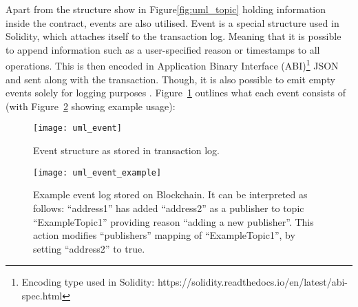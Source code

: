 Apart from the structure show in Figure\ref{fig:uml_topic} holding information inside the contract, events are also utilised. Event is a special structure used in Solidity, which attaches itself to the transaction log. Meaning that it is possible to append information such as a user-specified reason or timestamps to all operations. This is then encoded in Application Binary Interface (ABI)\footnote{Encoding type used in Solidity: https://solidity.readthedocs.io/en/latest/abi-spec.html} JSON and sent along with the transaction. Though, it is also possible to emit empty events solely for logging purposes \citep{dannen2017introducing}.  Figure~\ref{fig:uml_event} outlines what each event consists of (with Figure~\ref{fig:uml_event_example} showing example usage):

\begin{figure}[h]
    \centering
    \texttt{[image: uml\_event]}
    \caption{Event structure as stored in transaction log.}
    \label{fig:uml_event}
\end{figure}
\begin{figure}[h]
    \centering
    \texttt{[image: uml\_event\_example]}
    \caption{Example event log stored on Blockchain. It can be interpreted as follows: ``address1'' has added ``address2'' as a publisher to topic ``ExampleTopic1'' providing reason ``adding a new publisher''. This action modifies ``publishers'' mapping of ``ExampleTopic1'', by setting ``address2'' to true.}
    \label{fig:uml_event_example}
\end{figure}

